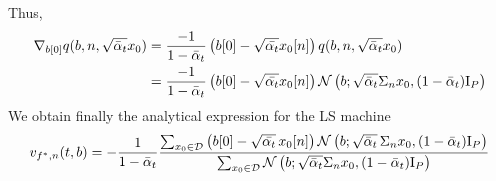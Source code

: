 \documentclass[a4paper,10pt]{article}
\begin{document}
Thus,
\begin{align*}
    \nabla_{b[0]}q(b, n, \sqrt{\bar\alpha_t}x_0) &= \frac{-1}{1-\bar\alpha_t} \left(b[0] -  \sqrt{\bar{\alpha_t}}x_0[n]\right) q(b, n, \sqrt{\bar\alpha_t}x_0)\\
    &= \frac{-1}{1-\bar\alpha_t} \left(b[0] -  \sqrt{\bar{\alpha_t}}x_0[n]\right) \mathcal{N}\left( {b; \sqrt{\bar \alpha_t} \Sigma_n x_0, (1-\bar\alpha_t) \mathrm{I}_P} \right)
\end{align*}
We obtain finally the analytical expression for the LS machine
\begin{equation}
    v_{f^*,n}(t,b) = -\frac{1}{1-\bar\alpha_t} \frac{\sum_{x_0\in\mathcal{D}}\left(b[0] -  \sqrt{\bar{\alpha_t}}\,x_0[n]\right) \mathcal{N}\left( {b; \sqrt{\bar \alpha_t} \,\Sigma_n x_0, (1-\bar\alpha_t) \mathrm{I}_P} \right)}{\sum_{x_0 \in \mathcal{D}} \mathcal{N}\left( {b; \sqrt{\bar \alpha_t} \Sigma_n x_0, (1-\bar\alpha_t) \mathrm{I}_P} \right)}
\end{equation}
\end{document}
